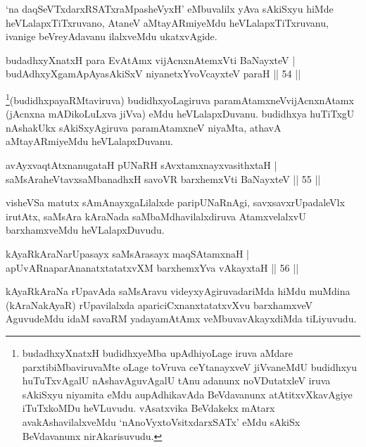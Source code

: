 \begin{artha}
`na daqSeVTxdarxRSATxraMpasheVyxH' eMbuvalilx yAva sAkiSxyu hiMde heVLalapxTiTxru\-vano, AtaneV aMtayARmiyeMdu heVLalapxTiTxruvanu, ivanige beVreyAdavanu ilalxveMdu ukatxvAgide.
\end{artha}


\begin{shl}
budadhxyXnatxH para EvA\s \s tAmx vijAcnxnAtemxVti BaNayxteV |\\
budAdhxyXgamApAyasAkiSxV niyanetxYvoVcayxteV paraH \hfill || 54 ||
\end{shl}

\begin{artha}
\footnote{budadhxyXnatxH budidhxyeMba upAdhiyoLage iruva aMdare parxtibiMbaviruvaMte oLage toVruva ceYtanayxveV jiVvaneMdU budidhxyu huTuTxvAgalU nAshavAguvAgalU tAnu adanunx noVDutatxleV iruva sAkiSxyu niyamita eMdu aupAdhikavAda BeVdavanunx atAtitxvXkavAgiye iTuTxkoMDu heVLuvudu. vAsatxvika BeVdakekx mAtarx avakAshavilalxveMdu `nAnoVyxtoV\s sitxdarxSATx' eMdu sAkiSx BeVdavanunx nirAkarisuvudu.}(budidhxpayaRMtaviruva) budidhxyoLagiruva paramAtamxneV\break vijAcnxnAtamx (jAcnxna mADikoLuLxva jiVva) eMdu heVLalapxDuvanu. budidhxya huTiTxgU nAshakUkx sAkiSxyAgiruva paramAtamxneV niyaMta, athavA aMtayARmiyeMdu heVLalapxDuvanu.
\end{artha}


\begin{shl}
avAyxvaqtAtxnanugataH pUNaRH sAvxtamxnayxvasithxtaH |\\
saMsAraheVtavxsaMbanadhxH savoVR barxhemxVti BaNayxteV \hfill || 55 ||
\end{shl}

\begin{artha}
visheVSa matutx sAmAnayxgaLilalxde paripUNaRnAgi, savxsavxrUpadaleVlx irutAtx, saMsAra kAraNada saMbaMdhavilalxdiruva AtamxvelalxvU barxhamxveMdu heVLalapxDuvudu.
\end{artha}

\begin{shl}
kAyaRkAraNarUpasayx saMsArasayx maqSAtamxnaH |\\
apUvARnaparAnanatxtatatxvXM barxhemxYva vAkayxtaH \hfill || 56 ||
\end{shl}

\begin{artha}%
kAyaRkAraNa rUpavAda saMsAravu videyxyAgiruvadariMda hiMdu muMdina (kAraNakAyaR) rUpavilalxda apariciCxnanxtatatxvXvu barxhamxveV AguvudeMdu idaM savaRM yadayamAtAmx veMbuva\break vAkayxdiMda tiLiyuvudu.
\end{artha}

